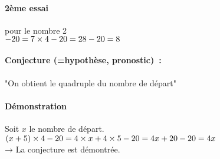 \documentclass[
	a4paper,
	twocolumn=false,
	12pts,
	DIV=calc]%
	{article}
\begin{document}
\paragraph{2ème essai}pour le nombre 2\\
\begin{math}
	[(2+5)\times 4]-20\\
	=7\times 4 -20\\
	=28-20\\
	=8
\end{math}

\paragraph{Conjecture (=hypothèse, pronostic)~:}"On obtient le quadruple du nombre de départ"

\paragraph{Démonstration}
Soit $x$ le nombre de départ.\\
\begin{math}
(x+5)\times 4 - 20\\
= 4\times x + 4\times 5 - 20\\
= 4x + 20 - 20\\
=4x
\end{math}
\\→ La conjecture est démontrée.
\end{document}
